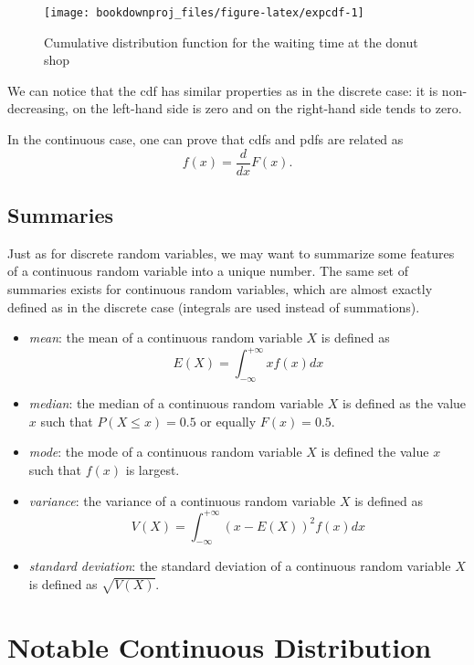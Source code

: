 \documentclass[
]{book}
\theoremstyle{definition}
\theoremstyle{definition}
\theoremstyle{definition}
\theoremstyle{definition}
\theoremstyle{remark}
\begin{document}
\begin{figure}

{\centering \texttt{[image: bookdownproj\_files/figure-latex/expcdf-1]} 

}

\caption{Cumulative distribution function for the waiting time at the donut shop}\label{fig:expcdf}
\end{figure}

We can notice that the cdf has similar properties as in the discrete case: it is non-decreasing, on the left-hand side is zero and on the right-hand side tends to zero.

In the continuous case, one can prove that cdfs and pdfs are related as
\[
f(x)=\frac{d}{dx}F(x).
\]

\hypertarget{summaries-1}{%
\subsection{Summaries}\label{summaries-1}}

Just as for discrete random variables, we may want to summarize some features of a continuous random variable into a unique number. The same set of summaries exists for continuous random variables, which are almost exactly defined as in the discrete case (integrals are used instead of summations).

\begin{itemize}
\item
  \emph{mean}: the mean of a continuous random variable \(X\) is defined as
  \[
   E(X) = \int_{-\infty}^{+\infty}xf(x)dx
   \]
\item
  \emph{median}: the median of a continuous random variable \(X\) is defined as the value \(x\) such that \(P(X\leq x) = 0.5\) or equally \(F(x)=0.5\).
\item
  \emph{mode}: the mode of a continuous random variable \(X\) is defined the value \(x\) such that \(f(x)\) is largest.
\item
  \emph{variance}: the variance of a continuous random variable \(X\) is defined as
  \[
   V(X)=\int_{-\infty}^{+\infty}(x-E(X))^2f(x)dx
   \]
\item
  \emph{standard deviation}: the standard deviation of a continuous random variable \(X\) is defined as \(\sqrt{V(X)}\).
\end{itemize}

\hypertarget{notable-continuous-distribution}{%
\section{Notable Continuous Distribution}\label{notable-continuous-distribution}}
\end{document}

